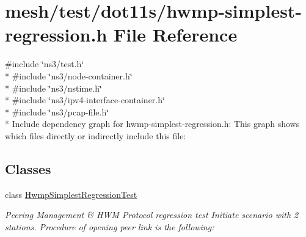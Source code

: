 \hypertarget{hwmp-simplest-regression_8h}{}\section{mesh/test/dot11s/hwmp-\/simplest-\/regression.h File Reference}
\label{hwmp-simplest-regression_8h}
{\ttfamily \#include \char`\"{}ns3/test.\+h\char`\"{}}\\*
{\ttfamily \#include \char`\"{}ns3/node-\/container.\+h\char`\"{}}\\*
{\ttfamily \#include \char`\"{}ns3/nstime.\+h\char`\"{}}\\*
{\ttfamily \#include \char`\"{}ns3/ipv4-\/interface-\/container.\+h\char`\"{}}\\*
{\ttfamily \#include \char`\"{}ns3/pcap-\/file.\+h\char`\"{}}\\*
Include dependency graph for hwmp-\/simplest-\/regression.h\+:
This graph shows which files directly or indirectly include this file\+:
\subsection*{Classes}
\begin{DoxyCompactItemize}
\item 
class \hyperlink{classHwmpSimplestRegressionTest}{Hwmp\+Simplest\+Regression\+Test}
\begin{DoxyCompactList}\small\item\em Peering Management \& H\+WM Protocol regression test Initiate scenario with 2 stations. Procedure of opening peer link is the following\+: \end{DoxyCompactList}\end{DoxyCompactItemize}
